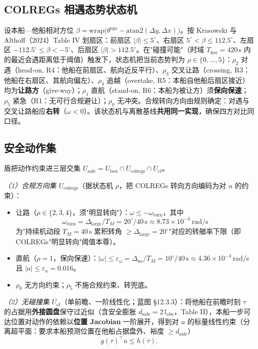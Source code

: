 \documentclass[12pt,letterpaper]{article}
\begin{document}
\subsection{COLREGs 相遇态势状态机}
设本船—他船相对方位 $\beta=\mathrm{wrap}\big(\theta^{\text{ego}}-\mathrm{atan2}(\Delta y,\Delta x)\big)$。按 Krasowski 与 Althoff（2024）Table IV 划扇区：前扇区 $|\beta|\le 5^\circ$、右扇区 $5^\circ<\beta\le112.5^\circ$、左扇区 $-112.5^\circ\le\beta<-5^\circ$、后扇区 $|\beta|>112.5^\circ$。在"碰撞可能"（时域 $T_{\text{hor}}=420$\,s 内的最近会遇距离低于阈值）触发下，状态机把当前态势判为 $\rho\in\{0,\dots,5\}$：$\rho_2$ 对遇（head-on, R4：他船在前扇区、航向近反平行）、$\rho_3$ 交叉让路（crossing, R3：他船在右扇区、其航向偏左）、$\rho_4$ 追越（overtake, R5：本船自他船后扇区接近）均为\textbf{让路方}（give-way）；$\rho_1$ 直航（stand-on, R6：本船为被让方）须\textbf{保向保速}；$\rho_5$ 紧急（R1：无可行合规避让）；$\rho_0$ 无冲突。合规转向方向由规则确定：对遇与交叉让路船应\textbf{右转}（$\omega<0$）。该状态机与离散基线\textbf{共用同一实现}，确保四方对比同口径。

\subsection{安全动作集}
盾把动作约束进三层交集 $U_{\text{safe}}=U_{\text{box}}\cap U_{\text{colregs}}\cap U_{\text{cf}}$。

\textit{（1）合规方向集 $U_{\text{colregs}}$}（据状态机 $\rho$，把 COLREGs 转向方向编码为对 $u$ 的约束）：
\begin{itemize}
  \item 让路（$\rho\in\{2,3,4\}$，须"明显转向"）：$\omega\le-\omega_{\text{turn}}$，其中
  \begin{equation}
  \omega_{\text{turn}}=\Delta_{\text{large}}/T_M = 20^\circ/40\,\text{s}\approx 8.73\times10^{-3}\ \text{rad/s}
  \end{equation}
  为"持续机动段 $T_M=40$\,s 累积转角 $\ge\Delta_{\text{large}}=20^\circ$"对应的转艏率下限（即 COLREGs"明显转向"阈值本尊）。
  \item 直航（$\rho=1$，保向保速）：$|\omega|\le\varepsilon_\omega=\Delta_{\text{no}}/T_M=10^\circ/40\,\text{s}\approx4.36\times10^{-3}$\,rad/s 且 $|a|\le\varepsilon_a=0.016$。
  \item $\rho_0$ 无方向约束；$\rho_5$ 不施合规约束、转兜底。
\end{itemize}

\textit{（2）无碰撞集 $U_{\text{cf}}$}（单前瞻、一阶线性化；蓝图 §12.3.3）：将他船在前瞻时刻 $\tau$ 的占据用\textbf{外接圆盘}保守过近似（含安全膨胀 $d_{\text{safe}}=2\,l_{\text{obs}}$，Table II），本船一步可达位置对动作的依赖以\textbf{位置 Jacobian} 一阶展开，得到对 $u$ 的标量线性约束（分离超平面：要求本船预测位置在他船占据盘外、裕度 $\ge d_{\text{safe}}$）
\begin{equation}
g(\tau)^\top u \le h(\tau).
\end{equation}
\end{document}
